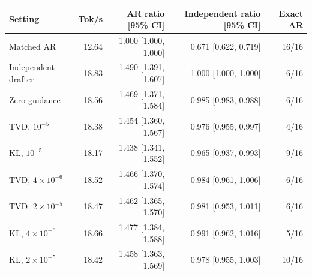 \begin{tabular}{lrrrr}
\toprule
Setting & Tok/s & AR ratio [95\% CI] & Independent ratio [95\% CI] & Exact AR \\
\midrule
Matched AR & 12.64 & 1.000 [1.000, 1.000] & 0.671 [0.622, 0.719] & 16/16 \\
Independent drafter & 18.83 & 1.490 [1.391, 1.607] & 1.000 [1.000, 1.000] & 6/16 \\
Zero guidance & 18.56 & 1.469 [1.371, 1.584] & 0.985 [0.983, 0.988] & 6/16 \\
TVD, $10^{-5}$ & 18.38 & 1.454 [1.360, 1.567] & 0.976 [0.955, 0.997] & 4/16 \\
KL, $10^{-5}$ & 18.17 & 1.438 [1.341, 1.552] & 0.965 [0.937, 0.993] & 9/16 \\
TVD, $4\times10^{-6}$ & 18.52 & 1.466 [1.370, 1.574] & 0.984 [0.961, 1.006] & 6/16 \\
TVD, $2\times10^{-5}$ & 18.47 & 1.462 [1.365, 1.570] & 0.981 [0.953, 1.011] & 6/16 \\
KL, $4\times10^{-6}$ & 18.66 & 1.477 [1.384, 1.588] & 0.991 [0.962, 1.016] & 5/16 \\
KL, $2\times10^{-5}$ & 18.42 & 1.458 [1.363, 1.569] & 0.978 [0.955, 1.003] & 10/16 \\
\bottomrule
\end{tabular}
